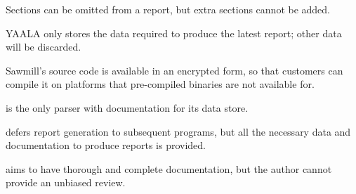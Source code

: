 \begin{table}[htb]
    \begin{eqlist}

        \item [\dag{}] Sections can be omitted from a report, but extra
            sections cannot be added.

        \item [\ddag{}] YAALA only stores the data required to produce the
            latest report; other data will be discarded.

        \item [\nialpha{}] Sawmill's source code is available in an
            encrypted form, so that customers can compile it on platforms
            that pre-compiled binaries are not available for.

        \item [\nibeta{}] \parsername{} is the only parser with
            documentation for its data store.

        \item [\nichi{}] \parsername{} defers report generation to
            subsequent programs, but all the necessary data and
            documentation to produce reports is provided.

        \item [\niepsilon{}] \parsername{} aims to have thorough and
            complete documentation, but the author cannot provide an
            unbiased review.

    \end{eqlist}

\end{table}

\clearpage{}
